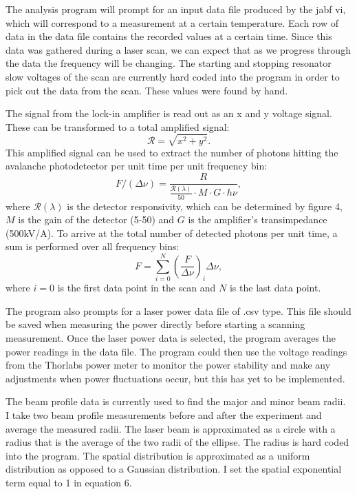 \documentclass[12pt, a4paper]{article}
\begin{document}
The analysis program will prompt for an input data file produced by the jabf vi, which will correspond to a measurement at a certain temperature. Each row of data in the data file contains the recorded values at a certain time. Since this data was gathered during a laser scan, we can expect that as we progress through the data the frequency will be changing. The starting and stopping resonator slow voltages of the scan are currently hard coded into the program in order to pick out the data from the scan. These values were found by hand. 


The signal from the lock-in amplifier is read out as an x and y voltage signal. These can be transformed to a total amplified signal:
\begin{equation}
\mathscr{R} = \sqrt{x^2+y^2}.
\end{equation}
This amplified signal can be used to extract the number of photons hitting the avalanche photodetector per unit time per unit frequency bin:
\begin{equation}
F/(\Delta \nu) = \frac{R}{\frac{\mathcal{R}(\lambda)}{50}\cdot M\cdot G \cdot h\nu},
\end{equation}
where $\mathcal{R}(\lambda)$ is the detector responsivity, which can be determined by figure 4, $M$ is the gain of the detector (5-50) and $G$ is the amplifier's transimpedance (500kV/A). To arrive at the total number of detected photons per unit time, a sum is performed over all frequency bins:
\begin{equation}
F = \sum_{i=0}^{N}(\frac{F}{\Delta \nu})_i \Delta \nu,
\end{equation}
where $i=0$ is the first data point in the scan and $N$ is the last data point.

The program also prompts for a laser power data file of .csv type. This file should be saved when measuring the power directly before starting a scanning measurement. Once the laser power data is selected, the program averages the power readings in the data file. The program could then use the voltage readings from the Thorlabs power meter to monitor the power stability and make any adjustments when power fluctuations occur, but this has yet to be implemented. 

The beam profile data is currently used to find the major and minor beam radii. I take two beam profile measurements before and after the experiment and average the measured radii.  The laser beam is approximated as a circle with a radius that is the average of the two radii of the ellipse. The radius is hard coded into the program. The spatial distribution is approximated as a uniform distribution as opposed to a Gaussian distribution. I set the spatial exponential term equal to 1 in equation 6. 
\end{document}
